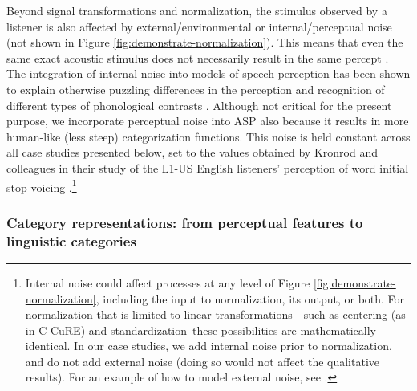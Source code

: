\documentclass[
  11pt,
  man,floatsintext]{apa6}
\begin{document}
Beyond signal transformations and normalization, the stimulus observed by a listener is also affected by external/environmental or internal/perceptual noise (not shown in Figure \ref{fig:demonstrate-normalization}). This means that even the same exact acoustic stimulus does not necessarily result in the same percept \autocites{leonard2016}[p.~148]{nearey-hogan1986}{schuerman2022}. The integration of internal noise into models of speech perception has been shown to explain otherwise puzzling differences in the perception and recognition of different types of phonological contrasts \autocites[e.g.,][]{feldman2009,kronrod2016}. Although not critical for the present purpose, we incorporate perceptual noise into ASP also because it results in more human-like (less steep) categorization functions. This noise is held constant across all case studies presented below, set to the values obtained by Kronrod and colleagues in their study of the L1-US English listeners' perception of word initial stop voicing \autocite*[\(\sigma^2_{noise, VOT}=80 msec^2\), \(\sigma^2_{noise, spectral}=878 Mel^2\)]{kronrod2016}.\footnote{Internal noise could affect processes at any level of Figure \ref{fig:demonstrate-normalization}, including the input to normalization, its output, or both. For normalization that is limited to linear transformations---such as centering (as in C-CuRE) and standardization--these possibilities are mathematically identical. In our case studies, we add internal noise prior to normalization, and do not add external noise (doing so would not affect the qualitative results). For an example of how to model external noise, see \textcite{burchill2023}.}

\hypertarget{sec:representations}{%
\subsubsection{Category representations: from perceptual features to linguistic categories}\label{sec:representations}}
\end{document}
